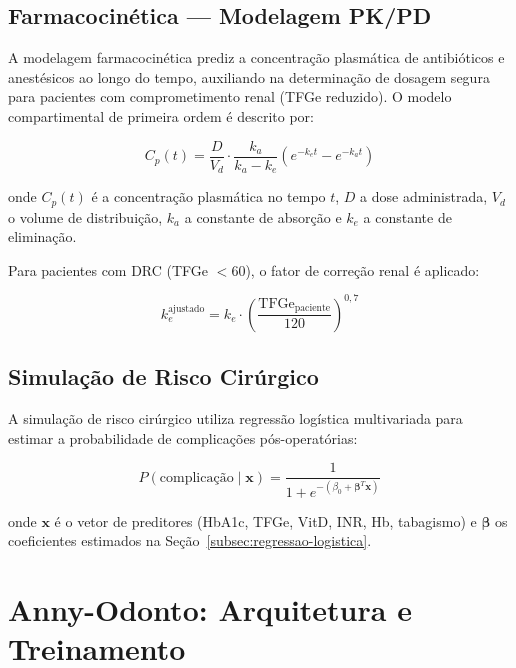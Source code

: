 \subsection{Farmacocinética — Modelagem PK/PD}
\label{subsec:pkpd}

A modelagem farmacocinética prediz a concentração plasmática de antibióticos e anestésicos ao longo do tempo, auxiliando na determinação de dosagem segura para pacientes com comprometimento renal (TFGe reduzido). O modelo compartimental de primeira ordem é descrito por:

\begin{equation}
\label{eq:pk}
C_p(t) = \frac{D}{V_d} \cdot \frac{k_a}{k_a - k_e} \left( e^{-k_e t} - e^{-k_a t} \right)
\end{equation}

onde $C_p(t)$ é a concentração plasmática no tempo $t$, $D$ a dose administrada, $V_d$ o volume de distribuição, $k_a$ a constante de absorção e $k_e$ a constante de eliminação.

Para pacientes com DRC (TFGe $< 60$), o fator de correção renal é aplicado:

\begin{equation}
\label{eq:correcao-renal}
k_e^{\text{ajustado}} = k_e \cdot \left( \frac{\text{TFGe}_{\text{paciente}}}{120} \right)^{0,7}
\end{equation}

\subsection{Simulação de Risco Cirúrgico}
\label{subsec:simulacao-risco}

A simulação de risco cirúrgico utiliza regressão logística multivariada para estimar a probabilidade de complicações pós-operatórias:

\begin{equation}
\label{eq:risco-logistico}
P(\text{complicação} \mid \mathbf{x}) = \frac{1}{1 + e^{-(\beta_0 + \boldsymbol{\beta}^T \mathbf{x})}}
\end{equation}

onde $\mathbf{x}$ é o vetor de preditores (HbA1c, TFGe, VitD, INR, Hb, tabagismo) e $\boldsymbol{\beta}$ os coeficientes estimados na Seção~\ref{subsec:regressao-logistica}.

\section{Anny-Odonto: Arquitetura e Treinamento}
\label{sec:anny-odonto}

